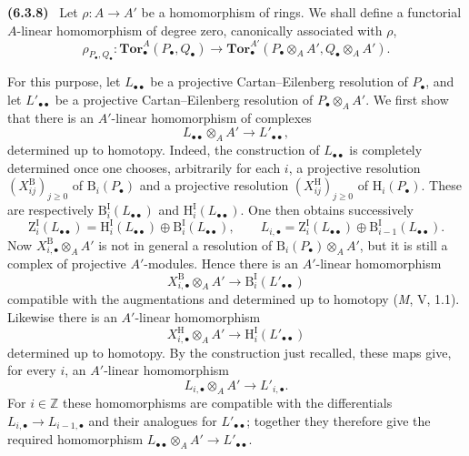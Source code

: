 \documentclass[10pt,oneside]{book}
\newcommand{\HH}{\mathrm H}
\newcommand{\oldpage}[2][]{\setcounter{footnote}{0}\marginpar{\scriptsize\textbf{#1}~|~#2}\ignorespaces}
\newenvironment{env}[1][]{\par\medskip\noindent\textbf{(#1)}\ }{\par}
\begin{document}
\begin{env}[6.3.8]
\label{III.6.3.8}
\oldpage[III]{144}
Let $\rho:A\longrightarrow A'$ be a homomorphism of rings.  We
shall define a functorial $A$-linear homomorphism of degree zero,
canonically associated with $\rho$,
\[
  \rho_{P_\bullet,Q_\bullet}:
  \mathbf{Tor}_\bullet^A(P_\bullet,Q_\bullet)
  \longrightarrow
  \mathbf{Tor}_\bullet^{A'}
  (P_\bullet\otimes_AA',Q_\bullet\otimes_AA').
  \tag{6.3.8.1}\label{III.6.3.8.1}
\]

For this purpose, let $L_{\bullet\bullet}$ be a projective
Cartan--Eilenberg resolution of $P_\bullet$, and let
$L'_{\bullet\bullet}$ be a projective Cartan--Eilenberg resolution
of $P_\bullet\otimes_AA'$.  We first show that there is an
$A'$-linear homomorphism of complexes
\[
  L_{\bullet\bullet}\otimes_AA'
  \longrightarrow L'_{\bullet\bullet},
\]
determined up to homotopy.  Indeed, the construction of
$L_{\bullet\bullet}$ is completely determined once one chooses,
arbitrarily for each $i$, a projective resolution
$(X_{ij}^{\mathrm B})_{j\geq0}$ of $\mathrm B_i(P_\bullet)$ and a
projective resolution $(X_{ij}^{\mathrm H})_{j\geq0}$ of
$\HH_i(P_\bullet)$.  These are respectively
$\mathrm B_i^{\mathrm I}(L_{\bullet\bullet})$ and
$\HH_i^{\mathrm I}(L_{\bullet\bullet})$.  One then obtains
successively
\[
  \mathrm Z_i^{\mathrm I}(L_{\bullet\bullet})
  =
  \HH_i^{\mathrm I}(L_{\bullet\bullet})
  \oplus
  \mathrm B_i^{\mathrm I}(L_{\bullet\bullet}),
  \qquad
  L_{i,\bullet}
  =
  \mathrm Z_i^{\mathrm I}(L_{\bullet\bullet})
  \oplus
  \mathrm B_{i-1}^{\mathrm I}(L_{\bullet\bullet}).
\]
Now $X_{i,\bullet}^{\mathrm B}\otimes_AA'$ is not in general a
resolution of $\mathrm B_i(P_\bullet)\otimes_AA'$, but it is still
a complex of projective $A'$-modules.  Hence there is an
$A'$-linear homomorphism
\[
  X_{i,\bullet}^{\mathrm B}\otimes_AA'
  \longrightarrow
  \mathrm B_i^{\mathrm I}(L'_{\bullet\bullet})
\]
compatible with the augmentations and determined up to homotopy
(\emph{M}, V, 1.1).  Likewise there is an $A'$-linear homomorphism
\[
  X_{i,\bullet}^{\mathrm H}\otimes_AA'
  \longrightarrow
  \HH_i^{\mathrm I}(L'_{\bullet\bullet})
\]
determined up to homotopy.  By the construction just recalled,
these maps give, for every $i$, an $A'$-linear homomorphism
\[
  L_{i,\bullet}\otimes_AA'\longrightarrow L'_{i,\bullet}.
\]
For $i\in\mathbb Z$ these homomorphisms are compatible with the
differentials $L_{i,\bullet}\longrightarrow L_{i-1,\bullet}$ and
their analogues for $L'_{\bullet\bullet}$; together they therefore
give the required homomorphism
$L_{\bullet\bullet}\otimes_AA'\longrightarrow L'_{\bullet\bullet}$.


\end{env}
\end{document}
